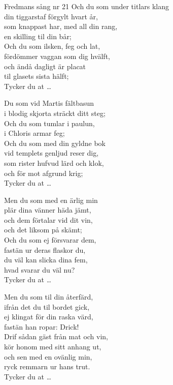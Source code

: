 \begin{song}{Fredmans sång nr 21}
	\showversenumber
	Och du som under titlars klang\\
	din tiggarstaf förgylt hvart år,\\
	som knappast har, med all din rang,\\
	en skilling til din bår;\\
	Och du som ilsken, feg och lat,\\
	fördömmer vaggan som dig hvälft,\\
	och ändå dagligt är placat\\
	til glasets sista hälft;\\
	Tycker du at \ldots{}
	
	\showversenumber	
	Du som vid Martis fältbasun\\
	i blodig skjorta sträckt ditt steg;\\
	Och du som tumlar i paulun,\\
	i Chloris armar feg;\\
	Och du som med din gyldne bok\\
	vid templets genljud reser dig,\\
	som rister hufvud lärd och klok,\\
	och för mot afgrund krig;\\
	Tycker du at \ldots{}
	
	\showversenumber
	Men du som med en ärlig min\\
	plär dina vänner häda jämt,\\
	och dem förtalar vid dit vin,\\
	och det liksom på skämt;\\
	Och du som ej försvarar dem,\\
	fastän ur deras flaskor du,\\
	du väl kan slicka dina fem,\\
	hvad svarar du väl nu?\\
	Tycker du at \ldots{}
	
	\showversenumber
	Men du som til din återfärd,\\
	ifrån det du til bordet gick,\\
	ej klingat för din raska värd,\\
	fastän han ropar: Drick!\\
	Drif sådan gäst från mat och vin,\\
	kör honom med sitt anhang ut,\\
	och sen med en ovänlig min,\\
	ryck remmarn ur hans trut.\\
	Tycker du at \ldots{}
	

\end{song}
